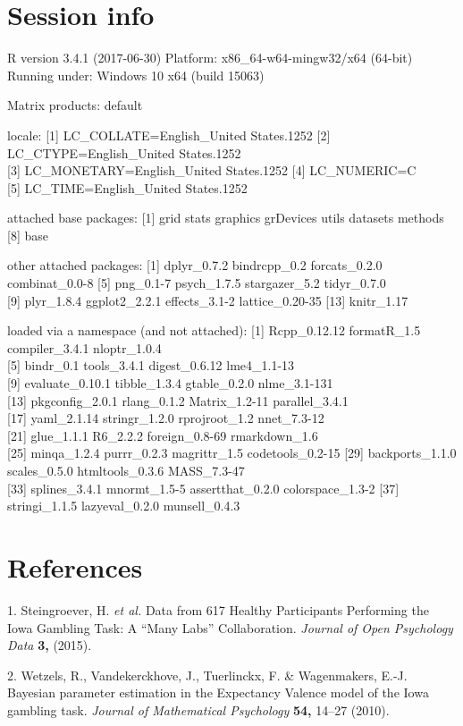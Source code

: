 \documentclass[11pt,,]{article}
\begin{document}
\newpage

\section{Session info}\label{session-info}

R version 3.4.1 (2017-06-30) Platform: x86\_64-w64-mingw32/x64 (64-bit)
Running under: Windows 10 x64 (build 15063)

Matrix products: default

locale: {[}1{]} LC\_COLLATE=English\_United States.1252 {[}2{]}
LC\_CTYPE=English\_United States.1252\\
{[}3{]} LC\_MONETARY=English\_United States.1252 {[}4{]} LC\_NUMERIC=C\\
{[}5{]} LC\_TIME=English\_United States.1252

attached base packages: {[}1{]} grid stats graphics grDevices utils
datasets methods\\
{[}8{]} base

other attached packages: {[}1{]} dplyr\_0.7.2 bindrcpp\_0.2
forcats\_0.2.0 combinat\_0.0-8 {[}5{]} png\_0.1-7 psych\_1.7.5
stargazer\_5.2 tidyr\_0.7.0\\
{[}9{]} plyr\_1.8.4 ggplot2\_2.2.1 effects\_3.1-2 lattice\_0.20-35
{[}13{]} knitr\_1.17

loaded via a namespace (and not attached): {[}1{]} Rcpp\_0.12.12
formatR\_1.5 compiler\_3.4.1 nloptr\_1.0.4\\
{[}5{]} bindr\_0.1 tools\_3.4.1 digest\_0.6.12 lme4\_1.1-13\\
{[}9{]} evaluate\_0.10.1 tibble\_1.3.4 gtable\_0.2.0 nlme\_3.1-131\\
{[}13{]} pkgconfig\_2.0.1 rlang\_0.1.2 Matrix\_1.2-11 parallel\_3.4.1\\
{[}17{]} yaml\_2.1.14 stringr\_1.2.0 rprojroot\_1.2 nnet\_7.3-12\\
{[}21{]} glue\_1.1.1 R6\_2.2.2 foreign\_0.8-69 rmarkdown\_1.6\\
{[}25{]} minqa\_1.2.4 purrr\_0.2.3 magrittr\_1.5 codetools\_0.2-15
{[}29{]} backports\_1.1.0 scales\_0.5.0 htmltools\_0.3.6 MASS\_7.3-47\\
{[}33{]} splines\_3.4.1 mnormt\_1.5-5 assertthat\_0.2.0
colorspace\_1.3-2 {[}37{]} stringi\_1.1.5 lazyeval\_0.2.0 munsell\_0.4.3

\section*{References}\label{references}

\hypertarget{refs}{}
\hypertarget{ref-steingroever_data_2015}{}
1. Steingroever, H. \emph{et al.} Data from 617 Healthy Participants
Performing the Iowa Gambling Task: A ``Many Labs'' Collaboration.
\emph{Journal of Open Psychology Data} \textbf{3,} (2015).

\hypertarget{ref-wetzels_bayesian_2010}{}
2. Wetzels, R., Vandekerckhove, J., Tuerlinckx, F. \& Wagenmakers, E.-J.
Bayesian parameter estimation in the Expectancy Valence model of the
Iowa gambling task. \emph{Journal of Mathematical Psychology}
\textbf{54,} 14--27 (2010).
\end{document}
